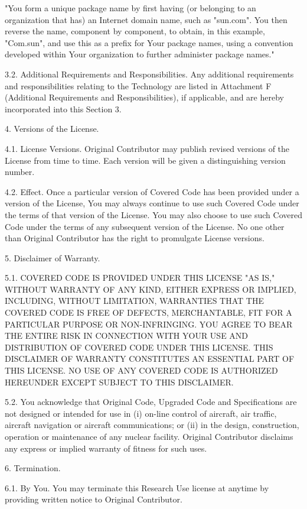 {"You form a unique package name by first having (or belonging to an
organization that has) an Internet domain name, such as "sun.com".
You then reverse the name, component by component, to obtain, in this
example, "Com.sun", and use this as a prefix for Your package names,
using a convention developed within Your organization to further
administer package names."

3.2.  Additional Requirements and Responsibilities.  Any additional
requirements and responsibilities relating to the Technology are
listed in Attachment F (Additional Requirements and Responsibilities),
if applicable, and are hereby incorporated into this Section 3.

4.  Versions of the License.

4.1.  License Versions.  Original Contributor may publish revised
versions of the License from time to time.  Each version will be given
a distinguishing version number.

4.2.  Effect.  Once a particular version of Covered Code has been
provided under a version of the License, You may always continue to
use such Covered Code under the terms of that version of the License.
You may also choose to use such Covered Code under the terms of any
subsequent version of the License.  No one other than Original
Contributor has the right to promulgate License versions.

5.  Disclaimer of Warranty.

5.1.  COVERED CODE IS PROVIDED UNDER THIS LICENSE "AS IS," WITHOUT
WARRANTY OF ANY KIND, EITHER EXPRESS OR IMPLIED, INCLUDING, WITHOUT
LIMITATION, WARRANTIES THAT THE COVERED CODE IS FREE OF DEFECTS,
MERCHANTABLE, FIT FOR A PARTICULAR PURPOSE OR NON-INFRINGING.  YOU
AGREE TO BEAR THE ENTIRE RISK IN CONNECTION WITH YOUR USE AND
DISTRIBUTION OF COVERED CODE UNDER THIS LICENSE.  THIS DISCLAIMER OF
WARRANTY CONSTITUTES AN ESSENTIAL PART OF THIS LICENSE.  NO USE OF ANY
COVERED CODE IS AUTHORIZED HEREUNDER EXCEPT SUBJECT TO THIS
DISCLAIMER.

5.2.  You acknowledge that Original Code, Upgraded Code and
Specifications are not designed or intended for use in (i) on-line
control of aircraft, air traffic, aircraft navigation or aircraft
communications; or (ii) in the design, construction, operation or
maintenance of any nuclear facility.  Original Contributor disclaims
any express or implied warranty of fitness for such uses.

6.  Termination.

6.1.  By You.  You may terminate this Research Use license at anytime
by providing written notice to Original Contributor.

}
